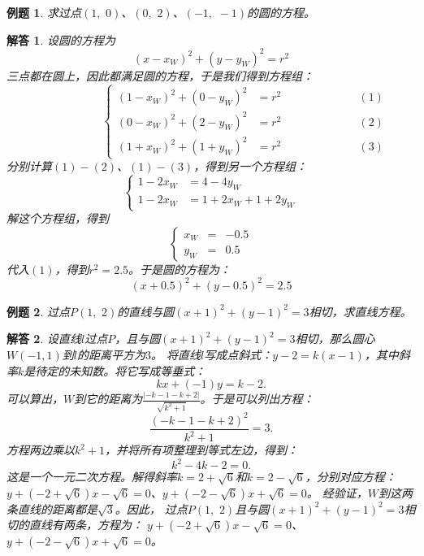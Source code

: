 \documentclass[12pt,UTF8]{ctexbook}
\newtheorem{et}{例题}[section]
\newtheorem*{so}{解答}
\begin{document}
\begin{et}
    求过点$(1, \,\, 0)$、$(0, \,\, 2)$、$(-1, \,\, -1)$的圆的方程。
\end{et}
\begin{so}
    设圆的方程为
    $$(x - x_W)^2 + (y - y_W)^2 = r^2$$
    三点都在圆上，因此都满足圆的方程，于是我们得到方程组：
    $$
    \qquad\qquad\qquad \left\{
    \begin{array}{llr}
        (1 - x_W)^2 + (0 - y_W)^2 &= r^2 &\qquad\qquad\qquad (1) \\
        (0 - x_W)^2 + (2 - y_W)^2 &= r^2 &\qquad\qquad\qquad (2) \\
        (1 + x_W)^2 + (1 + y_W)^2 &= r^2 &\qquad\qquad\qquad (3)
    \end{array}
    \right.
    $$
    分别计算$(1) - (2)$、$(1) - (3)$，得到另一个方程组：
    $$
    \left\{
    \begin{array}{ll}
        1 - 2x_W &= 4 - 4y_W \\
        1 - 2x_W &= 1 + 2x_W + 1 + 2y_W 
    \end{array}
    \right.
    $$  
    解这个方程组，得到
    $$
    \left\{
    \begin{array}{clr}
        x_W &=& -0.5 \\
        y_W &=& 0.5
    \end{array}
    \right.
    $$  
    代入$(1)$，得到$r^2 = 2.5$。于是圆的方程为：
    $$(x + 0.5)^2 + (y - 0.5)^2 = 2.5$$
\end{so}

\begin{et}
    过点$P(1, \,\, 2)$的直线与圆$(x + 1)^2 + (y - 1)^2 = 3$相切，求直线方程。
\end{et}
\begin{so}
设直线$l$过点$P$，且与圆$(x + 1)^2 + (y - 1)^2 = 3$相切，那么圆心$W(-1, 1)$到$l$的距离平方为$3$。
将直线$l$写成点斜式：$y - 2 = k(x - 1) $，其中斜率$k$是待定的未知数。将它写成等垂式：
$$kx + (-1)y = k - 2. $$
可以算出，$W$到它的距离为$\frac{|- k - 1 - k + 2|}{\sqrt{k^2 + 1}}$。于是可以列出方程：
$$\frac{(- k - 1 - k + 2)^2}{k^2 + 1} = 3.$$
方程两边乘以$k^2 + 1$，并将所有项整理到等式左边，得到：
$$ k^2 - 4k - 2 = 0.$$
这是一个一元二次方程。解得斜率$k = 2 + \sqrt{6}$和$k = 2 - \sqrt{6}$，分别对应方程：
$y + (- 2 + \sqrt{6}) x - \sqrt{6} = 0$、$y + (- 2 - \sqrt{6}) x + \sqrt{6} = 0$。
经验证，$W$到这两条直线的距离都是$\sqrt{3}$。因此，
过点$P(1, \,\, 2)$且与圆$(x + 1)^2 + (y - 1)^2 = 3$相切的直线有两条，方程为：
$y + (- 2 + \sqrt{6}) x - \sqrt{6} = 0$、$y + (- 2 - \sqrt{6}) x + \sqrt{6} = 0$。    
\end{so}
\end{document}
